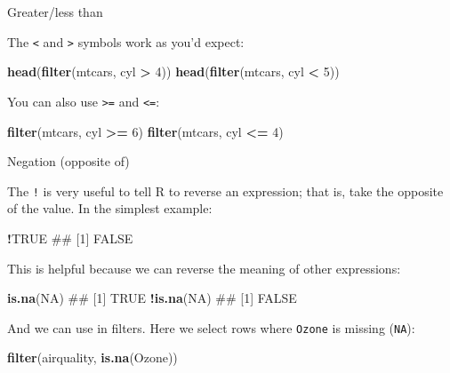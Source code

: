 \documentclass[]{article}
\newenvironment{Shaded}{\begin{snugshade}}{\end{snugshade}}
\newcommand{\KeywordTok}[1]{\textcolor[rgb]{0.13,0.29,0.53}{\textbf{#1}}}
\newcommand{\DecValTok}[1]{\textcolor[rgb]{0.00,0.00,0.81}{#1}}
\newcommand{\StringTok}[1]{\textcolor[rgb]{0.31,0.60,0.02}{#1}}
\newcommand{\OtherTok}[1]{\textcolor[rgb]{0.56,0.35,0.01}{#1}}
\newcommand{\OperatorTok}[1]{\textcolor[rgb]{0.81,0.36,0.00}{\textbf{#1}}}
\newcommand{\NormalTok}[1]{#1}
\theoremstyle{definition}
\theoremstyle{definition}
\theoremstyle{definition}
\theoremstyle{remark}
\begin{document}
Greater/less than

The \texttt{\textless{}} and \texttt{\textgreater{}} symbols work as
you'd expect:

\begin{Shaded}
\begin{Highlighting}[]
\KeywordTok{head}\NormalTok{(}\KeywordTok{filter}\NormalTok{(mtcars, cyl }\OperatorTok{>}\StringTok{ }\DecValTok{4}\NormalTok{))}
\KeywordTok{head}\NormalTok{(}\KeywordTok{filter}\NormalTok{(mtcars, cyl }\OperatorTok{<}\StringTok{ }\DecValTok{5}\NormalTok{))}
\end{Highlighting}
\end{Shaded}

You can also use \texttt{\textgreater{}=} and \texttt{\textless{}=}:

\begin{Shaded}
\begin{Highlighting}[]
\KeywordTok{filter}\NormalTok{(mtcars, cyl }\OperatorTok{>=}\StringTok{ }\DecValTok{6}\NormalTok{)}
\KeywordTok{filter}\NormalTok{(mtcars, cyl }\OperatorTok{<=}\StringTok{ }\DecValTok{4}\NormalTok{)}
\end{Highlighting}
\end{Shaded}

Negation (opposite of)

The \texttt{!} is very useful to tell R to reverse an expression; that
is, take the opposite of the value. In the simplest example:

\begin{Shaded}
\begin{Highlighting}[]
\OperatorTok{!}\OtherTok{TRUE}
\NormalTok{## [1] FALSE}
\end{Highlighting}
\end{Shaded}

This is helpful because we can reverse the meaning of other expressions:

\begin{Shaded}
\begin{Highlighting}[]
\KeywordTok{is.na}\NormalTok{(}\OtherTok{NA}\NormalTok{)}
\NormalTok{## [1] TRUE}
\OperatorTok{!}\KeywordTok{is.na}\NormalTok{(}\OtherTok{NA}\NormalTok{)}
\NormalTok{## [1] FALSE}
\end{Highlighting}
\end{Shaded}

And we can use in filters. Here we select rows where \texttt{Ozone} is
missing (\texttt{NA}):

\begin{Shaded}
\begin{Highlighting}[]
\KeywordTok{filter}\NormalTok{(airquality, }\KeywordTok{is.na}\NormalTok{(Ozone))}
\end{Highlighting}
\end{Shaded}
\end{document}
